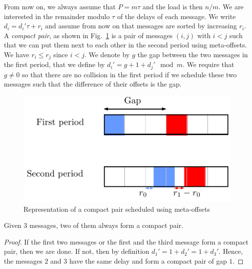 \documentclass[a4paper,UKenglish,cleveref, autoref, thm-restate]{lipics-v2019}
\begin{document}
From now on, we always assume that $P = m\tau$ and the load is then $n/m$.
We are interested in the remainder modulo $\tau$ of the delays of each message.
We write $d_i = d_{i}'\tau + r_i$ and assume from now on that messages are sorted by increasing $r_i$.
A \emph{compact pair}, as shown in Fig.~\ref{fig:compactpair} is a pair of messages $(i,j)$ with $i < j$ such that we can put them next to each other in the second period using meta-offsets.
We have $r_i \leq r_j$ since $i < j$. We denote by $g$ the gap between the two messages in the first period, that we define by $d_{i}' = g + 1 + d_{j}' \mod m$. We require that $g \neq 0$ so that there are no collision in the first period if we schedule these two messages such that the difference of their offsets is the gap. 

\begin{figure}[h]
\begin{center}

\includegraphics[scale=0.7]{compact_pair}
\end{center}
\caption{Representation of a compact pair scheduled using meta-offsets}
\label{fig:compactpair}
\end{figure}

\begin{lemma}\label{lemma:pair_find}
Given $3$ messages, two of them always form a compact pair. 
\end{lemma}
\begin{proof}
If the first two messages or the first and the third message form a compact pair,
then we are done. If not, then by definition $d_{1}' = 1 + d_{2}' = 1 + d_{3}'$. Hence, the messages $2$ and $3$ have the same delay and form a compact pair of gap $1$.
\end{proof}
\end{document}
